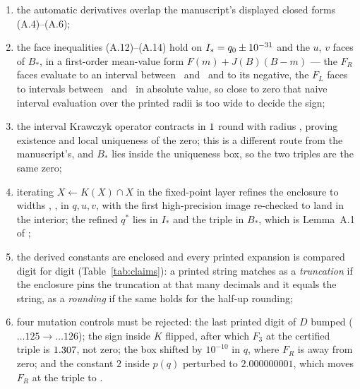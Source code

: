 \documentclass[11pt]{article}
\begin{document}
\begin{enumerate}
\item the automatic derivatives overlap the manuscript's displayed closed forms (A.4)--(A.6);
\item the face inequalities (A.12)--(A.14) hold on $I_*=q_0\pm10^{-31}$ and the $u$, $v$ faces of
$B_*$, in a first-order mean-value form $F(m)+J(B)(B-m)$ --- the $F_R$ faces evaluate to an
interval between \FaceRLo\ and \FaceRHi\ and to its negative, the $F_L$ faces to intervals
between \FaceLLo\ and \FaceLHi\ in absolute value, so close to zero that naive interval
evaluation over the printed radii is too wide to decide the sign;
\item the interval Krawczyk operator \cite{Krawczyk69} contracts in $1$ round with
radius \KrawczykRad, proving existence and local uniqueness of the zero; this is a different
route from the manuscript's, and $B_*$ lies inside the uniqueness box, so the two triples are
the same zero;
\item iterating $X\leftarrow K(X)\cap X$ in the fixed-point layer refines the enclosure to widths
\WidthQ, \WidthU, \WidthV in $q,u,v$, with the first high-precision image re-checked to
land in the interior; the refined $q^*$ lies in $I_*$ and the triple in $B_*$, which is
Lemma~A.1 of \cite{DPT};
\item the derived constants are enclosed and every printed expansion is compared digit for
digit (Table~\ref{tab:claims}): a printed string matches as a \emph{truncation} if the enclosure
pins the truncation at that many decimals and it equals the string, as a \emph{rounding} if the
same holds for the half-up rounding;
\item four mutation controls must be rejected: the last printed digit of $D$ bumped
($\ldots125\to\ldots126$); the sign inside $K$ flipped, after which $F_3$ at the certified triple
is $1.307$, not zero; the box shifted by $10^{-10}$ in $q$, where $F_R$ is \MutThree away
from zero; and the constant $2$ inside $p(q)$ perturbed to $2.000000001$, which moves $F_R$ at
the triple to \MutFour.
\end{enumerate}

\begin{table}[h]\centering\small
{}
\caption{Every decimal expansion the manuscript prints for its extremal constants, against the
certified enclosures (thin to $40$ decimals; shown to three decimals past the printed length).
Nine match as truncations; the thirty-decimal headline $D$ matches as a half-up rounding.}\label{tab:claims}
\end{table}
\end{document}
